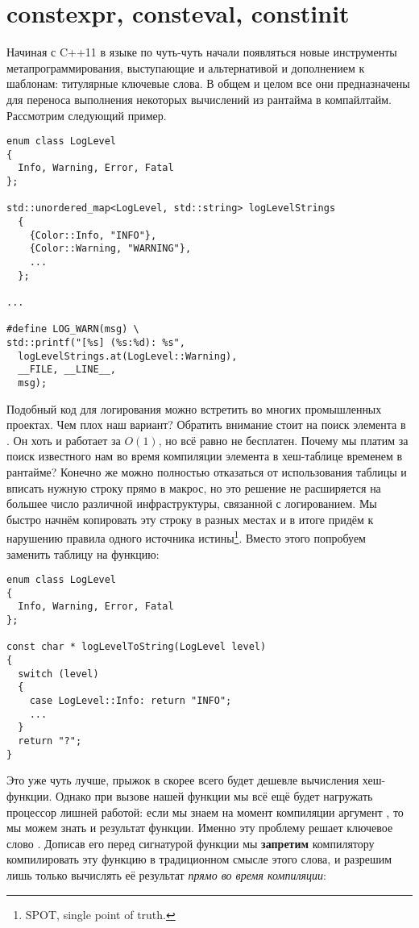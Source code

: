 \section{constexpr, consteval, constinit}
Начиная с C++11 в языке по чуть-чуть начали появляться новые инструменты метапрограммирования, выступающие и альтернативой и дополнением к шаблонам: титулярные ключевые слова.
В общем и целом все они предназначены для переноса выполнения некоторых вычислений из рантайма в компайлтайм.
Рассмотрим следующий пример.
\begin{verbatim}
enum class LogLevel
{
  Info, Warning, Error, Fatal
};

std::unordered_map<LogLevel, std::string> logLevelStrings
  {
    {Color::Info, "INFO"},
    {Color::Warning, "WARNING"},
    ...
  };

...

#define LOG_WARN(msg) \
std::printf("[%s] (%s:%d): %s",
  logLevelStrings.at(LogLevel::Warning),
  __FILE, __LINE__,
  msg);
\end{verbatim}
Подобный код для логирования можно встретить во многих промышленных проектах.
Чем плох наш вариант? Обратить внимание стоит на поиск элемента в .
Он хоть и работает за $O(1)$, но всё равно не бесплатен.
Почему мы платим за поиск известного нам во время компиляции элемента в хеш-таблице временем в рантайме? Конечно же можно полностью отказаться от использования таблицы и вписать нужную строку прямо в макрос, но это решение не расширяется на большее число различной инфраструктуры, связанной с логированием.
Мы быстро начнём копировать эту строку в разных местах и в итоге придём к нарушению правила одного источника истины\footnote{SPOT, single point of truth.}.
Вместо этого попробуем заменить таблицу на функцию:
\begin{verbatim}
enum class LogLevel
{
  Info, Warning, Error, Fatal
};

const char * logLevelToString(LogLevel level)
{
  switch (level)
  {
    case LogLevel::Info: return "INFO";
    ...
  }
  return "?";
}
\end{verbatim}
Это уже чуть лучше, прыжок в  скорее всего будет дешевле вычисления хеш-функции.
Однако при вызове нашей функции мы всё ещё будет нагружать процессор лишней работой: если мы знаем на момент компиляции аргумент , то мы можем знать и результат функции.
Именно эту проблему решает ключевое слово \inlcpp{consteval}.
Дописав его перед сигнатурой функции мы \textbf{запретим} компилятору компилировать эту функцию в традиционном смысле этого слова, и разрешим лишь только вычислять её результат \textit{прямо во время компиляции}:
